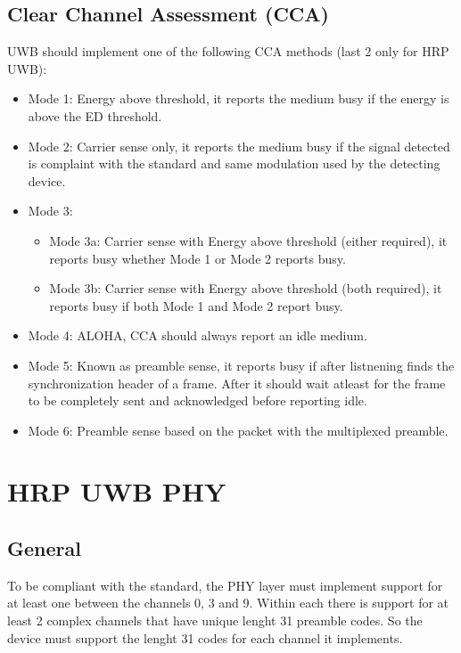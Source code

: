 \documentclass[conference]{IEEEtran}
\begin{document}
\subsection{Clear Channel Assessment (CCA)}
UWB should implement one of the following CCA methods (last 2 only for HRP UWB):
\begin{itemize}
    \item Mode 1: Energy above threshold, it reports the medium busy if the energy is above
          the ED threshold.
    \item Mode 2: Carrier sense only, it reports the medium busy if the signal detected is
          complaint with the standard and same modulation used by the detecting device.
    \item Mode 3:
    \begin{itemize}
      \item Mode 3a: Carrier sense with Energy above threshold (either required), it reports 
            busy whether Mode 1 or Mode 2 reports busy.
      \item Mode 3b: Carrier sense with Energy above threshold (both required), it reports 
            busy if both Mode 1 and Mode 2 report busy.
    \end{itemize}
    \item Mode 4: ALOHA, CCA should always report an idle medium.
    \item Mode 5: Known as preamble sense, it reports busy if after listnening finds the 
          synchronization header of a frame. After it should wait atleast for the frame to be
          completely sent and acknowledged before reporting idle.
    \item Mode 6: Preamble sense based on the packet with the multiplexed preamble.
\end{itemize}

\section{HRP UWB PHY}
\subsection{General}
To be compliant with the standard, the PHY layer must implement support for at least one
between the channels 0, 3 and 9. Within each there is support for at least 2 complex channels
that have unique lenght 31 preamble codes. So the device must support the lenght 31 codes for
each channel it implements.\\
\end{document}
